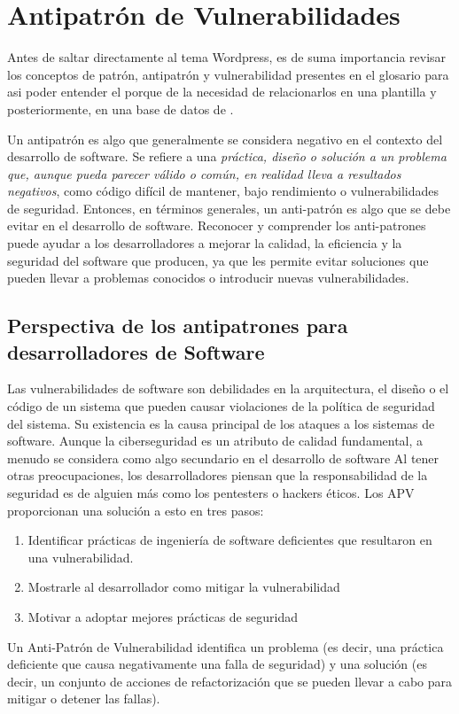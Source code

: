 
\chapter{Antipatrón de Vulnerabilidades}    

Antes de saltar directamente al tema Wordpress, es de suma importancia revisar los conceptos de \gls{patrón}, \gls{antipatrón} y \gls{vulnerabilidad} presentes en el glosario para asi poder entender el porque de la necesidad de relacionarlos en una plantilla y posteriormente, en una base de datos de .

\vspace{0.3cm}
Un \gls{antipatrón} es algo que generalmente se considera negativo en el contexto del desarrollo de software. Se refiere a una \textit{práctica, diseño o solución a un problema que, aunque pueda parecer válido o común, en realidad lleva a resultados negativos}, como código difícil de mantener, bajo rendimiento o vulnerabilidades de seguridad.
Entonces, en términos generales, un anti-patrón es algo que se debe evitar en el desarrollo de software. Reconocer y comprender los anti-patrones puede ayudar a los desarrolladores a mejorar la calidad, la eficiencia y la seguridad del software que producen, ya que les permite evitar soluciones que pueden llevar a problemas conocidos o introducir nuevas vulnerabilidades.

\section{Perspectiva de los antipatrones para desarrolladores de Software}

Las \gls{vulnerabilidad}es de software son debilidades en la arquitectura, el diseño o el código de un sistema que pueden causar violaciones de la política de seguridad del sistema. Su existencia es la causa principal de los ataques a los sistemas de software. Aunque la ciberseguridad es un atributo de calidad fundamental, a menudo se considera como algo secundario en el desarrollo de software
Al tener otras preocupaciones, los desarrolladores piensan que la responsabilidad de la seguridad es de alguien más como los pentesters o hackers éticos. Los APV proporcionan una solución a esto en tres pasos:

\begin{enumerate}
    \item Identificar prácticas de ingeniería de software deficientes que resultaron en una vulnerabilidad.
    \item Mostrarle al desarrollador como mitigar la vulnerabilidad
    \item Motivar a adoptar mejores prácticas de seguridad
\end{enumerate}
Un Anti-Patrón de Vulnerabilidad identifica un problema (es decir, una práctica deficiente que causa negativamente una falla de seguridad) y una solución (es decir, un conjunto de acciones de refactorización que se pueden llevar a cabo para mitigar o detener las fallas).

